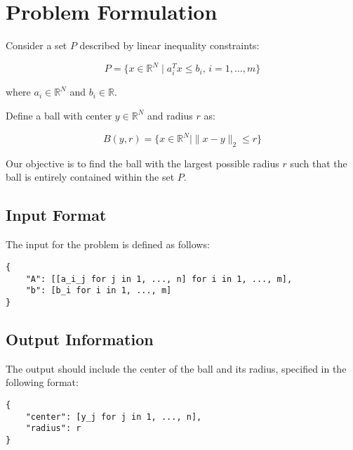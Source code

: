 \documentclass{article}
\begin{document}
\section*{Problem Formulation}

Consider a set \( P \) described by linear inequality constraints:

\[
P = \{ x \in \mathbb{R}^N \mid a_i^T x \leq b_i, \, i = 1, \ldots, m \}
\]

where \( a_i \in \mathbb{R}^N \) and \( b_i \in \mathbb{R} \).

Define a ball with center \( y \in \mathbb{R}^N \) and radius \( r \) as:

\[
B(y, r) = \{ x \in \mathbb{R}^N \mid \| x - y \|_2 \leq r \}
\]

Our objective is to find the ball with the largest possible radius \( r \) such that the ball is entirely contained within the set \( P \).

\subsection*{Input Format}

The input for the problem is defined as follows:

\begin{verbatim}
{
    "A": [[a_i_j for j in 1, ..., n] for i in 1, ..., m],
    "b": [b_i for i in 1, ..., m]
}
\end{verbatim}

\subsection*{Output Information}

The output should include the center of the ball and its radius, specified in the following format:

\begin{verbatim}
{
    "center": [y_j for j in 1, ..., n],
    "radius": r
}
\end{verbatim}
\end{document}
